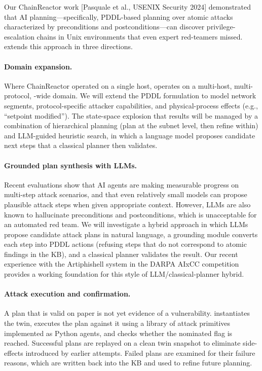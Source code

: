 Our ChainReactor work [Pasquale et al., USENIX Security 2024] demonstrated that AI
planning---specifically, PDDL-based planning over atomic attacks
characterized by preconditions and postconditions---can discover
privilege-escalation chains in Unix environments that even expert
red-teamers missed. \sysname extends this approach in three directions.

\paragraph{Domain expansion.}
Where ChainReactor operated on a single host, \sysname operates on a
multi-host, multi-protocol, \cps-wide domain. We will extend the
PDDL formulation to model network segments, protocol-specific
attacker capabilities, and physical-process effects (e.g., ``setpoint
modified''). The state-space explosion that results will be managed
by a combination of hierarchical planning (plan at the subnet level,
then refine within) and LLM-guided heuristic search, in which a
language model proposes candidate next steps that a classical planner
then validates.

\paragraph{Grounded plan synthesis with LLMs.}
Recent evaluations show that AI agents are making measurable progress
on multi-step attack scenarios, and that even relatively small models
can propose plausible attack steps when given appropriate context.
However, LLMs are also known to hallucinate preconditions and
postconditions, which is unacceptable for an automated red team. We
will investigate a hybrid approach in which LLMs propose candidate
attack plans in natural language, a grounding module converts each
step into PDDL actions (refusing steps that do not correspond to
atomic findings in the KB), and a classical planner validates the
result. Our recent experience with the Artiphishell system in the
DARPA AIxCC competition provides a working foundation for this style
of LLM/classical-planner hybrid.

\paragraph{Attack execution and confirmation.}
A plan that is valid on paper is not yet evidence of a vulnerability.
\sysname instantiates the twin, executes the plan against it using a
library of attack primitives implemented as Python agents, and checks
whether the nominated flag is reached. Successful plans are replayed
on a clean twin snapshot to eliminate side-effects introduced by
earlier attempts. Failed plans are examined for their failure reasons,
which are written back into the KB and used to refine future planning.

